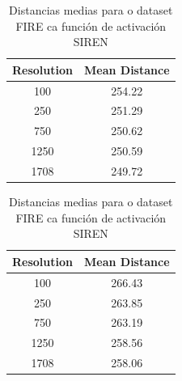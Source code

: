 \begin{table}[h]
    \centering
    \begin{minipage}[t]{0.45\linewidth}
        \centering
        \begin{tabular}{|c|c|}
        \hline
        Resolution & Mean Distance \\ \hline
        100 & 254.22 \\ \hline
        250 & 251.29 \\ \hline
        750 & 250.62 \\ \hline
        1250 & 250.59 \\ \hline
        1708 & 249.72 \\ \hline
        \end{tabular}
        \caption{Distancias medias para o dataset FIRE ca función de activación Relu}
        \label{tab:mlp_mean_distances_fire}
    \end{minipage}
    \hfill
    \begin{minipage}[t]{0.45\linewidth}
        \centering
        \begin{tabular}{|c|c|}
        \hline
        Resolution & Mean Distance \\ \hline
        100 & 266.43 \\ \hline
        250 & 263.85 \\ \hline
        750 & 263.19 \\ \hline
        1250 & 258.56 \\ \hline
        1708 & 258.06 \\ \hline
        \end{tabular}
        \caption{Distancias medias para o dataset FIRE ca función de activación SIREN}
        \label{tab:siren_mean_distances_fire}
    \end{minipage}
\end{table}

